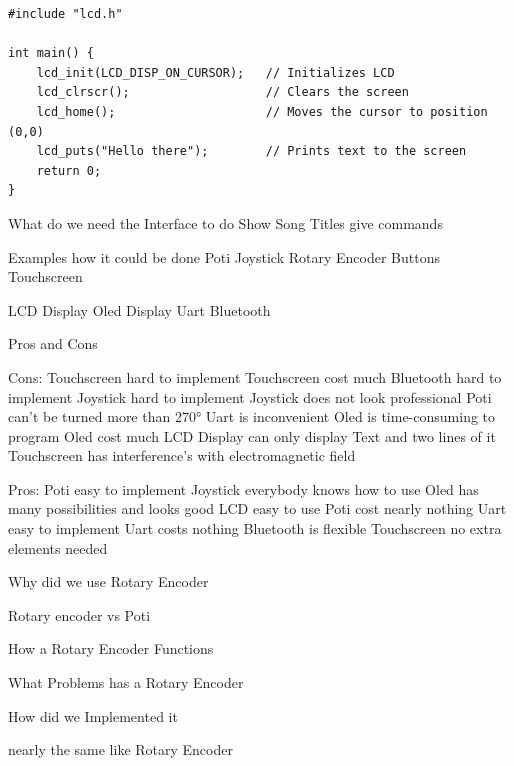 \begin{lstlisting}[caption=LCD Library, label=lst:lcdlibary]
#include "lcd.h"

int main() {
    lcd_init(LCD_DISP_ON_CURSOR);   // Initializes LCD
    lcd_clrscr();                   // Clears the screen
    lcd_home();                     // Moves the cursor to position (0,0)
    lcd_puts("Hello there");        // Prints text to the screen
    return 0;
}
\end{lstlisting}




































What do we need the Interface to do
    Show Song Titles
    give commands


Examples how it could be done
    Poti
    Joystick
    Rotary Encoder
    Buttons
    Touchscreen
    
    LCD Display
    Oled Display
    Uart
    Bluetooth

Pros and Cons

    Cons:
    Touchscreen hard to implement
    Touchscreen cost much
    Bluetooth hard to implement
    Joystick hard to implement
    Joystick does not look professional
    Poti can't be turned more than 270°
    Uart is inconvenient
    Oled is time-consuming to program
    Oled cost much
    LCD Display can only display Text and two lines of it
    Touchscreen has interference's with electromagnetic field 
    
    Pros:
    Poti easy to implement
    Joystick everybody knows how to use
    Oled has many possibilities and looks good
    LCD easy to use
    Poti cost nearly nothing
    Uart easy to implement
    Uart costs nothing
    Bluetooth is flexible
    Touchscreen no extra elements needed
    


Why did we use Rotary Encoder

Rotary encoder vs Poti

How a Rotary Encoder Functions

What Problems has a Rotary Encoder

How did we Implemented it 


nearly the same like Rotary Encoder